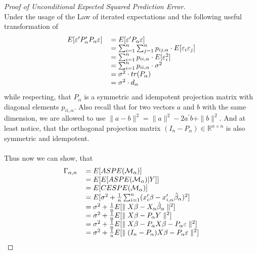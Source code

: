 \documentclass[Research_Module_ES.tex]{subfiles}
\begin{document}
\begin{proof}[Proof of Unconditional Expected Squared Prediction Error]~\\
	Under the usage of the Law of iterated expectations and the following useful transformation of
	\begin{align*}
	\begin{tabular}{ll}
	$E[\varepsilon^\prime P_\alpha^\prime P_\alpha\varepsilon]$&$=E[\varepsilon^\prime P_\alpha\varepsilon]$\\
	&$=\sum_{i=1}^{n}\sum_{j=1}^{n}p_{ij,\alpha}\cdot E[\varepsilon_i\varepsilon_j]$\\
	&$=\sum_{i=1}^{n}p_{ii,\alpha}\cdot E[\varepsilon_i^2]$\\
	&$=\sum_{i=1}^{n}p_{ii,\alpha}\cdot \sigma^2$\\
	&$=\sigma^2\cdot tr(P_\alpha)$\\
	&$=\sigma^2\cdot d_\alpha$
	\end{tabular}
	\end{align*}
	while respecting, that $P_\alpha$ is a symmetric and idempotent projection matrix with diagonal elements $p_{ii,\alpha}$. Also recall that for two vectors $a$ and $b$ with the same dimension, we are allowed to use $\parallel a-b\parallel^2=\parallel a\parallel^2-2a^\prime b+\parallel b\parallel^2$. And at least notice, that the orthogonal projection matrix $(I_n-P_\alpha)\in\mathbb{R}^{n\times n}$ is also symmetric and idempotent.\\\\
	Thus now we can show, that
	\begin{align*}
	\begin{tabular}{ll}
	$\Gamma_{\alpha,n}$&$=E[ASPE(\mathcal{M}_\alpha)]$\\
	&$=E[E[ASPE(\mathcal{M}_\alpha)|Y]]$\\
	&$=E[CESPE(\mathcal{M}_\alpha)]$\\
	&$=E[\sigma^2+\frac{1}{n}\sum_{i=1}^{n}(x_i^\prime\beta-x_{i,\alpha}^\prime\hat{\beta}_\alpha)^2]$\\
	&$=\sigma^2+\frac{1}{n}E[\parallel X\beta-X_\alpha\hat{\beta}_\alpha\parallel^2]$\\
	&$=\sigma^2+\frac{1}{n}E[\parallel X\beta-P_\alpha Y\parallel^2]$\\
	&$=\sigma^2+\frac{1}{n}E[\parallel X\beta-P_\alpha X\beta-P_\alpha\varepsilon\parallel^2]$\\
	&$=\sigma^2+\frac{1}{n}E[\parallel (I_n-P_\alpha)X\beta-P_\alpha\varepsilon\parallel^2]$\\

\end{tabular}
\end{align*}
\end{proof}
\end{document}
